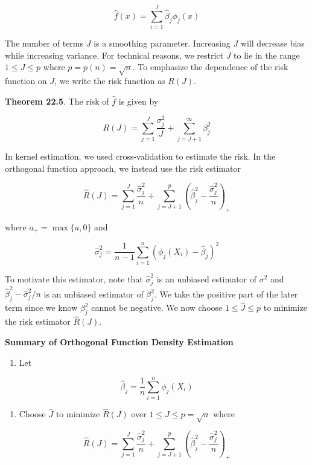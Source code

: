 \[ \hat{f}(x) = \sum_{i=1}^J \hat{\beta}_j \phi_j(x) \]

The number of terms \(J\) is a smoothing parameter. Increasing \(J\)
will decrease bias while increasing variance. For technical reasons, we
restrict \(J\) to lie in the range \(1 \leq J \leq p\) where
\(p = p(n) = \sqrt{n}\). To emphasize the dependence of the risk
function on \(J\), we write the risk function as \(R(J)\).

\textbf{Theorem 22.5}. The risk of \(\hat{f}\) is given by

\[ R(J) = \sum_{j=1}^J \frac{\sigma_j^2}{J} + \sum_{j=J+1}^\infty \beta_j^2 \]

In kernel estimation, we used cross-validation to estimate the risk. In
the orthogonal function approach, we instead use the risk estimator

\[ \hat{R}(J) = \sum_{j=1}^J \frac{\hat{\sigma}_j^2}{n} + \sum_{j=J+1}^p \left( \hat{\beta}_j^2 - \frac{\hat{\sigma}_j^2}{n} \right)_{+}\]

where \(a_{+} = \max \{ a, 0 \}\) and

\[ \hat{\sigma}_j^2 = \frac{1}{n - 1} \sum_{i=1}^n \left( \phi_j(X_i) - \hat{\beta}_j\right)^2 \]

To motivate this estimator, note that \(\hat{\sigma}_j^2\) is an
unbiased estimator of \(\sigma^2\) and
\(\hat{\beta}_j^2 - \hat{\sigma}_j^2 / n\) is an unbiased estimator of
\(\beta_j^2\). We take the positive part of the later term since we know
\(\beta_j^2\) cannot be negative. We now choose
\(1 \leq \hat{J} \leq p\) to minimize the risk estimator \(\hat{R}(J)\).

\textbf{Summary of Orthogonal Function Density Estimation}

\begin{enumerate}[tightlist,label={\arabic*.}]
\item
  Let
\end{enumerate}

\[ \hat{\beta}_j = \frac{1}{n} \sum_{i=1}^n \phi_j(X_i) \]

\begin{enumerate}[tightlist,label={\arabic*.}]
\item
  Choose \(\hat{J}\) to minimize \(\hat{R}(J)\) over
  \(1 \leq J \leq p = \sqrt{n}\) where
\end{enumerate}

\[ \hat{R}(J) = \sum_{j=1}^J \frac{\hat{\sigma}_j^2}{n} + \sum_{j=J+1}^p \left( \hat{\beta}_j^2 - \frac{\hat{\sigma}_j^2}{n} \right)_{+}\]

